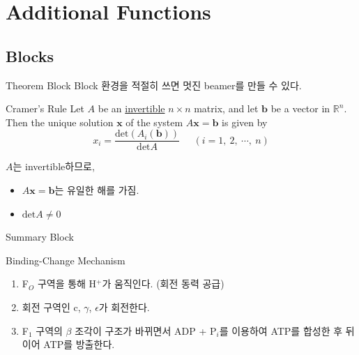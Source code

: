 \documentclass[12pt]{gshs_beamer_class}
\begin{document}
\section{Additional Functions}

\subsection{Blocks}

\begin{frame}[t]{Theorem Block}
	Block 환경을 적절히 쓰면 멋진 beamer를 만들 수 있다.
	\begin{block}{Cramer's Rule}
		Let $A$ be an \underline{invertible} \underline{$n \times n$} matrix, and let $\mathbf{b}$ be a vector in $\mathbb{R}^n$. Then the unique solution $ \mathbf{x} $ of the system $A\mathbf{x} = \mathbf{b}$ is given by
		\begin{equation*}
			x_i = \frac{\mathrm{det} ( A_i (\mathbf{b}))}{\mathrm{det} A}  \; \; \; \; \; (i = 1, ~ 2, ~\cdots , ~n)
		\end{equation*}
	\end{block}
	\vspace{15pt}
	$A$는 invertible하므로,
	\begin{itemize}
		\item $A\mathbf{x} = \mathbf{b}$는 유일한 해를 가짐.
		\item $ \mathrm{det} A \neq 0 $
	\end{itemize}
\end{frame}

\begin{frame}[t]{Summary Block}
\begin{block}{Binding-Change Mechanism}
	\begin{enumerate}\scriptsize
		\item F$_O$ 구역을 통해 H$^+$가 움직인다. (회전 동력 공급)
		\item 회전 구역인 c, $\gamma$, $\epsilon$가 회전한다.
		\item F$_1$ 구역의 $\beta$ 조각이 구조가 바뀌면서 ADP + P$_i$를 이용하여 ATP를 합성한 후 뒤이어 ATP를 방출한다.
	\end{enumerate}
\end{block}
\end{frame}
\end{document}
